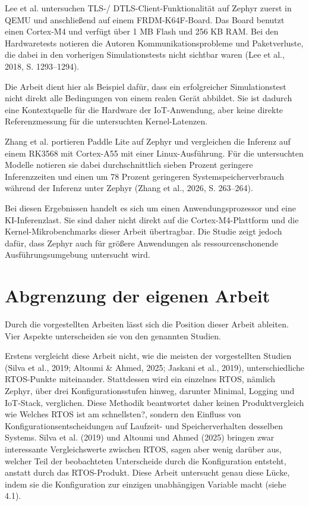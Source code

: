 Lee et al. untersuchen TLS-/ DTLS-Client-Funktionalit{\"a}t auf Zephyr zuerst in QEMU und anschlie{\ss}end auf einem FRDM-K64F-Board. Das Board benutzt einen Cortex-M4 und verf{\"u}gt {\"u}ber 1 MB Flash und 256 KB RAM. Bei den Hardwaretests notieren die Autoren Kommunikationsprobleme und Paketverluste, die dabei in den vorherigen Simulationstests nicht sichtbar waren (Lee et al., 2018, S. 1293--1294).

Die Arbeit dient hier als Beispiel daf{\"u}r, dass ein erfolgreicher Simulationstest nicht direkt alle Bedingungen von einem realen Ger{\"a}t abbildet. Sie ist dadurch eine Kontextquelle f{\"u}r die Hardware der IoT-Anwendung, aber keine direkte Referenzmessung f{\"u}r die untersuchten Kernel-Latenzen.

Zhang et al. portieren Paddle Lite auf Zephyr und vergleichen die Inferenz auf einem RK3568 mit Cortex-A55 mit einer Linux-Ausf{\"u}hrung. F{\"u}r die untersuchten Modelle notieren sie dabei durchschnittlich sieben Prozent geringere Inferenzzeiten und einen um 78 Prozent geringeren Systemspeicherverbrauch w{\"a}hrend der Inferenz unter Zephyr (Zhang et al., 2026, S. 263--264).

Bei diesen Ergebnissen handelt es sich um einen Anwendungsprozessor und eine KI-Inferenzlast. Sie sind daher nicht direkt auf die Cortex-M4-Plattform und die Kernel-Mikrobenchmarks dieser Arbeit {\"u}bertragbar. Die Studie zeigt jedoch daf{\"u}r, dass Zephyr auch f{\"u}r gr{\"o}{\ss}ere Anwendungen als ressourcenschonende Ausf{\"u}hrungsumgebung untersucht wird.

\section{Abgrenzung der eigenen Arbeit}
Durch die vorgestellten Arbeiten l{\"a}sst sich die Position dieser Arbeit ableiten. Vier Aspekte unterscheiden sie von den genannten Studien.

Erstens vergleicht diese Arbeit nicht, wie die meisten der vorgestellten Studien (Silva et al., 2019; Altoumi \& Ahmed, 2025; Jaskani et al., 2019), unterschiedliche RTOS-Punkte miteinander. Stattdessen wird ein einzelnes RTOS, n{\"a}mlich Zephyr, {\"u}ber drei Konfigurationsstufen hinweg, darunter Minimal, Logging und IoT-Stack, verglichen. Diese Methodik beantwortet daher keinen Produktvergleich wie \glqq{}Welches RTOS ist am schnellsten?\grqq{}, sondern den Einfluss von Konfigurationsentscheidungen auf Laufzeit- und Speicherverhalten desselben Systems. Silva et al. (2019) und Altoumi und Ahmed (2025) bringen zwar interessante Vergleichswerte zwischen RTOS, sagen aber wenig dar{\"u}ber aus, welcher Teil der beobachteten Unterscheide durch die Konfiguration entsteht, anstatt durch das RTOS-Produkt. Diese Arbeit untersucht genau diese L{\"u}cke, indem sie die Konfiguration zur einzigen unabh{\"a}ngigen Variable macht (siehe 4.1).

